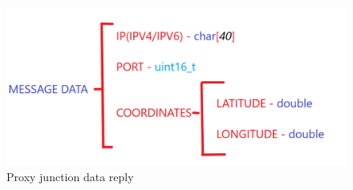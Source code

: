 \documentclass[17pt]{report}
\begin{document}
\begin{figure}[h!]
    \includegraphics[width=\textwidth]{Sketches/ProxyJunctionMessage.png}
    \caption{Proxy junction data reply}
    \label{fig:Proxy junction data reply}
\end{figure}

\end{document}
